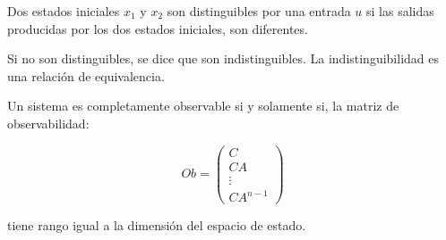 		\begin{definicion}
			Dos estados iniciales $x_1$ y $x_2$ son distinguibles por una entrada $u$ si las salidas producidas por los dos estados iniciales, son diferentes.

			Si no son distinguibles, se dice que son indistinguibles. La indistinguibilidad es una relación de equivalencia.
		\end{definicion}


		\begin{teorema}
			Un sistema es completamente observable si y solamente si, la matriz de observabilidad:

			\begin{equation}
				Ob =
				\begin{pmatrix}
					C \\
					CA \\
					\vdots \\
					CA^{n-1}
				\end{pmatrix}
			\end{equation}

			tiene rango igual a la dimensión del espacio de estado.
		\end{teorema}

